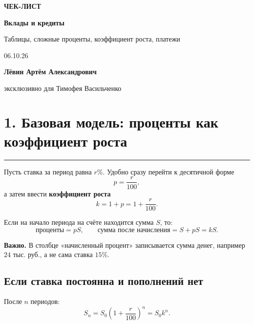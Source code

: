\documentclass[a4paper,12pt]{article}
\newcommand{\sectionline}{\vspace{-0.4em}\textcolor{linegray}{\rule{\linewidth}{0.5pt}}\vspace{0.35em}}
\newcommand{\key}[1]{\textcolor{darkaccent}{\textbf{#1}}}
\begin{document}
\thispagestyle{empty}
\begin{center}
\vspace*{2.8cm}
{\Large\textcolor{softgray}{\textbf{ЧЕК-ЛИСТ}}}\par
\vspace{0.7cm}
{\Huge\bfseries\textcolor{darkaccent}{Вклады и кредиты}}\par
\vspace{0.45cm}
{\Large Таблицы, сложные проценты, коэффициент роста, платежи}\par
\vspace{1.4cm}
{\large 06.10.26}\par
\vfill
{\large\textbf{Лёвин Артём Александрович}}\par
\vspace{0.2cm}
{\large эксклюзивно для Тимофея Васильченко}\par
\vspace{1.2cm}
\end{center}

\clearpage

\section*{1. Базовая модель: проценты как коэффициент роста}
\sectionline

Пусть ставка за период равна $r\%$. Удобно сразу перейти к десятичной форме
\[
p=\frac{r}{100},
\]
а затем ввести \key{коэффициент роста}
\[
k=1+p=1+\frac{r}{100}.
\]

Если на начало периода на счёте находится сумма $S$, то:
\[
\text{проценты}=pS,\qquad
\text{сумма после начисления}=S+pS=kS.
\]

\key{Важно.} В столбце «начисленный процент» записывается сумма денег, например $24$ тыс. руб., а не сама ставка $15\%$.

\subsection*{Если ставка постоянна и пополнений нет}
После $n$ периодов:
\[
\boxed{S_n=S_0\left(1+\frac{r}{100}\right)^n=S_0k^n.}
\]
\end{document}
